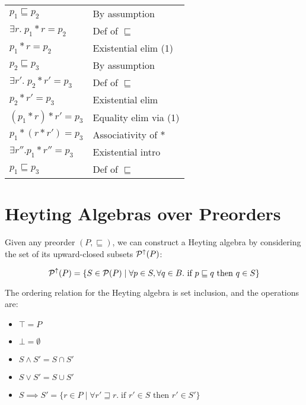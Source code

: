 \begin{tabular}{ll}
$p_1 \sqsubseteq p_2$                 & By assumption  \\
$\exists r.\; p_1 * r = p_2$          & Def of $\sqsubseteq$ \\
$p_1 * r = p_2$                       & Existential elim (1)\\
$p_2 \sqsubseteq p_3$                 & By assumption \\
$\exists r'.\; p_2 * r' = p_3$        & Def of $\sqsubseteq$ \\
$p_2 * r' = p_3$                      & Existential elim \\
$(p_1 * r) * r' = p_3$                & Equality elim via (1) \\
$p_1 * (r * r') = p_3$                & Associativity of $*$ \\
$\exists r''. p_1 * r'' = p_3$        & Existential intro \\
$p_1 \sqsubseteq p_3$                 & Def of $\sqsubseteq$ \\
\end{tabular}

\section{Heyting Algebras over Preorders}

Given any preorder $(P, \sqsubseteq)$, we can construct a Heyting
algebra by considering the set of its upward-closed subsets
$\mathcal{P}^{\uparrow}({P})$:

\begin{displaymath}
\mathcal{P}^{\uparrow}({P}) = 
  \{ S \in \mathcal{P}(P) \;|\;
     \forall p \in S, \forall q \in B. \mbox{ if } p \sqsubseteq q \mbox{ then } q \in S 
  \}
\end{displaymath}

The ordering relation for the Heyting algebra is set inclusion, and
the operations are:

\begin{itemize}
\item $\top = P$
\item $\bot = \emptyset$
\item $S \land S' = S \cap S'$
\item $S \vee S' = S \cup S'$
\item $S \implies S' = \{ r \in P \;|\; \forall r' \sqsupseteq r.\; 	
                          \mbox{if } r' \in S \mbox{ then } r' \in S' \}$
\end{itemize}

